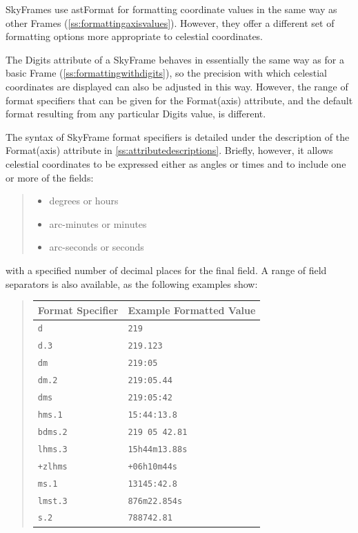 \documentclass[twoside,11pt]{article}
\newcommand{\htmlref}[2]{#1}
\newcommand{\appref}[1]{Appendix~\ref{#1}}
\newcommand{\secref}[1]{\S\ref{#1}}
\renewcommand{\appref}[1]{\ref{#1}}
\renewcommand{\secref}[1]{\ref{#1}}
\begin{document}
SkyFrames use \htmlref{astFormat}{astFormat} for formatting coordinate values in the same
way as other Frames (\secref{ss:formattingaxisvalues}). However, they
offer a different set of formatting options more appropriate to
celestial coordinates.

The Digits attribute of a \htmlref{SkyFrame}{SkyFrame} behaves in essentially the same way
as for a basic \htmlref{Frame}{Frame} (\secref{ss:formattingwithdigits}), so the
precision with which celestial coordinates are displayed can also be
adjusted in this way. However, the range of format specifiers that can
be given for the \htmlref{Format(axis)}{Formataxis} attribute, and the default format
resulting from any particular Digits value, is different.

The syntax of SkyFrame format specifiers is detailed under the
description of the Format(axis) attribute in
\appref{ss:attributedescriptions}.  Briefly, however, it allows
celestial coordinates to be expressed either as angles or times and to
include one or more of the fields:

\begin{quote}
\begin{itemize}
\item degrees or hours
\item arc-minutes or minutes
\item arc-seconds or seconds
\end{itemize}
\end{quote}

with a specified number of decimal places for the final field. A range
of field separators is also available, as the following examples show:

\begin{quote}
\begin{center}
\begin{tabular}{|l|l|}
\hline
{\bf{Format Specifier}} & {\bf{Example Formatted Value}}\\
\hline \hline
{\tt{d}} & {\tt{219}}\\
{\tt{d.3}} & {\tt{219.123}}\\
{\tt{dm}} & {\tt{219:05}}\\
{\tt{dm.2}} & {\tt{219:05.44}}\\
{\tt{dms}} & {\tt{219:05:42}}\\
{\tt{hms.1}} & {\tt{15:44:13.8}}\\
{\tt{bdms.2}} & {\tt{219 05 42.81}}\\
{\tt{lhms.3}} & {\tt{15h44m13.88s}}\\
{\tt{+zlhms}} & {\tt{+06h10m44s}}\\
{\tt{ms.1}} & {\tt{13145:42.8}}\\
{\tt{lmst.3}} & {\tt{876m22.854s}}\\
{\tt{s.2}} & {\tt{788742.81}}\\
\hline
\end{tabular}
\end{center}
\end{quote}
\end{document}
